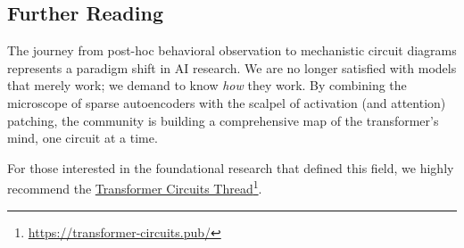 \subsection{Further Reading}
The journey from post-hoc behavioral observation to mechanistic circuit diagrams represents a paradigm shift in AI research. We are no longer satisfied with models that merely work; we demand to know \emph{how} they work. By combining the microscope of sparse autoencoders with the scalpel of activation (and attention) patching, the community is building a comprehensive map of the transformer's mind, one circuit at a time.


\begin{tcolorbox}[
    colback=blue!10!white,
    colframe=blue!85!black,
    title={\faExclamationCircle\quad Further Reading},
    fonttitle=\bfseries,
    coltitle=white,
    boxrule=1pt,
    arc=4pt,
    left=5pt,
    right=5pt,
    top=5pt,
    bottom=5pt,
    enhanced
]
For those interested in the foundational research that defined this field, we highly recommend the \href{https://transformer-circuits.pub/}{Transformer Circuits Thread}\footnote{\url{https://transformer-circuits.pub/}}. 
\end{tcolorbox}





